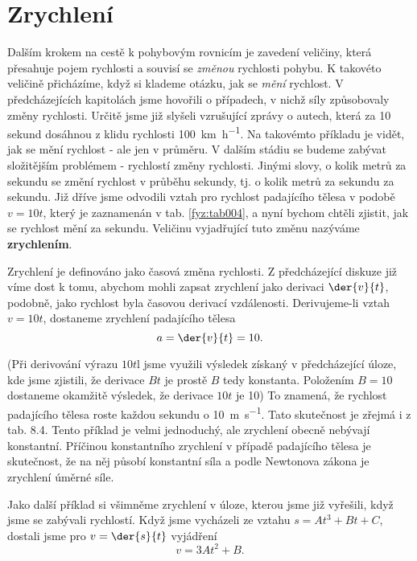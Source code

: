  \section{Zrychlení}
    Dalším krokem na cestě k pohybovým rovnicím je zavedení veličiny, která přesahuje pojem 
    rychlosti a souvisí se \emph{změnou} rychlosti pohybu. K takovéto veličině přicházíme, když si 
    klademe otázku, jak se \emph{mění} rychlost. V předcházejících kapitolách jsme hovořili o 
    případech, v nichž síly způsobovaly změny rychlosti. Určitě jsme již slyšeli vzrušující zprávy 
    o autech, která za \num{10} sekund dosáhnou z klidu rychlosti \qty{100}{km\per\hour}. Na 
    takovémto příkladu je vidět, jak se mění rychlost - ale jen v průměru. V dalším stádiu se 
    budeme zabývat složitějším problémem - rychlostí změny rychlosti. Jinými slovy, o kolik metrů 
    za sekundu se změní rychlost v průběhu sekundy, tj. o kolik metrů za sekundu za sekundu. Již 
    dříve jsme odvodili vztah pro rychlost padajícího tělesa v podobě \(v= 10 t\), který je 
    zaznamenán v tab. \ref{fyz:tab004}, a nyní bychom chtěli zjistit, jak se rychlost mění za 
    sekundu. Veličinu vyjadřující tuto změnu nazýváme \textbf{zrychlením}.
    
    Zrychlení je definováno jako časová změna rychlosti. Z předcházející diskuze již víme dost k 
    tomu, abychom mohli zapsat zrychlení jako derivaci \(\der{v}{t}\), podobně, jako rychlost byla 
    časovou derivací vzdálenosti. Derivujeme-li vztah \(v= 10t\), dostaneme zrychlení padajícího 
    tělesa
    \begin{equation}\label{fyz:eq101}
      a = \der{v}{t} = 10.
    \end{equation}
    
    (Při derivování výrazu \(10t\)l jsme využili výsledek získaný v předcházející úloze, kde jsme 
    zjistili, že derivace \(Bt\) je prostě \(B\) tedy konstanta. Položením \(B=10\) dostaneme 
    okamžitě výsledek, že derivace \(10t\) je \num{10}) To znamená, že rychlost padajícího tělesa 
    roste každou sekundu o \qty{10}{\m\per\s}. Tato skutečnost je zřejmá i z tab. 8.4. Tento příklad 
    je velmi jednoduchý, ale zrychlení obecně nebývají konstantní. Příčinou konstantního zrychlení 
    v případě padajícího tělesa je skutečnost, že na něj působí konstantní síla a podle Newtonova 
    zákona je zrychlení úměrné síle.
    
    Jako další příklad si všimněme zrychlení v úloze, kterou jsme již vyřešili, když jsme se 
    zabývali rychlostí. Když jsme vycházeli ze vztahu \(s = At^3 + Bt + C\), dostali jsme pro 
    \(v=\der{s}{t}\) vyjádření
    \begin{equation}\label{fyz:eq102}
      v = 3At^2 + B.
    \end{equation}
    

